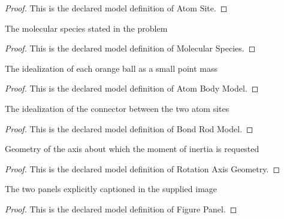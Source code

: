 \begin{proof}
  This is the declared model definition of Atom Site.
\end{proof}
\begin{definition}
  \label{def:physics:phyx-mini-0335:phyxminiproblems-problemphyxmini0335-molecularspecies}
  The molecular species stated in the problem
\end{definition}
\begin{proof}
  This is the declared model definition of Molecular Species.
\end{proof}
\begin{definition}
  \label{def:physics:phyx-mini-0335:phyxminiproblems-problemphyxmini0335-atombodymodel}
  The idealization of each orange ball as a small point mass
\end{definition}
\begin{proof}
  This is the declared model definition of Atom Body Model.
\end{proof}
\begin{definition}
  \label{def:physics:phyx-mini-0335:phyxminiproblems-problemphyxmini0335-bondrodmodel}
  The idealization of the connector between the two atom sites
\end{definition}
\begin{proof}
  This is the declared model definition of Bond Rod Model.
\end{proof}
\begin{definition}
  \label{def:physics:phyx-mini-0335:phyxminiproblems-problemphyxmini0335-rotationaxisgeometry}
  Geometry of the axis about which the moment of inertia is requested
\end{definition}
\begin{proof}
  This is the declared model definition of Rotation Axis Geometry.
\end{proof}
\begin{definition}
  \label{def:physics:phyx-mini-0335:phyxminiproblems-problemphyxmini0335-figurepanel}
  The two panels explicitly captioned in the supplied image
\end{definition}
\begin{proof}
  This is the declared model definition of Figure Panel.
\end{proof}
